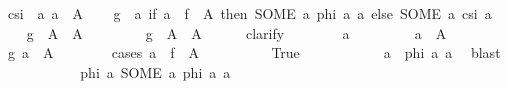 \begin{isabellebody}
\ {\isacharquery}{\kern0pt}csi\ {\isacharequal}{\kern0pt}\ {\isachardoublequoteopen}{\isasymlambda}a{\isachardot}{\kern0pt}\ a\ {\isasymin}\ A{\isachardoublequoteclose}\isanewline
\ \ \isamarkupfalse%
\ {\isacharquery}{\kern0pt}g\ {\isacharequal}{\kern0pt}\ {\isachardoublequoteopen}{\isasymlambda}a{\isacharprime}{\kern0pt}{\isachardot}{\kern0pt}\ if\ a{\isacharprime}{\kern0pt}\ {\isasymin}\ f\ {\isacharbackquote}{\kern0pt}\ A\ then\ {\isacharparenleft}{\kern0pt}SOME\ a{\isachardot}{\kern0pt}\ {\isacharquery}{\kern0pt}phi\ a{\isacharprime}{\kern0pt}\ a{\isacharparenright}{\kern0pt}\ else\ {\isacharparenleft}{\kern0pt}SOME\ a{\isachardot}{\kern0pt}\ {\isacharquery}{\kern0pt}csi\ a{\isacharparenright}{\kern0pt}{\isachardoublequoteclose}\isanewline
\ \ \isamarkupfalse%
\ {\isachardoublequoteopen}{\isacharquery}{\kern0pt}g\ {\isacharbackquote}{\kern0pt}\ A{\isacharprime}{\kern0pt}\ {\isacharequal}{\kern0pt}\ A{\isachardoublequoteclose}\isanewline
\ \ \isamarkupfalse%
\isanewline
\ \ \ \ \isamarkupfalse%
\ {\isachardoublequoteopen}{\isacharquery}{\kern0pt}g\ {\isacharbackquote}{\kern0pt}\ A{\isacharprime}{\kern0pt}\ {\isasymsubseteq}\ A{\isachardoublequoteclose}\isanewline
\ \ \ \ \isamarkupfalse%
\ clarify\isanewline
\ \ \ \ \ \ \isamarkupfalse%
\ a{\isacharprime}{\kern0pt}\isanewline
\ \ \ \ \ \ \isamarkupfalse%
\ {\isacharasterisk}{\kern0pt}{\isacharcolon}{\kern0pt}\ {\isachardoublequoteopen}a{\isacharprime}{\kern0pt}\ {\isasymin}\ A{\isacharprime}{\kern0pt}{\isachardoublequoteclose}\isanewline
\ \ \ \ \ \ \isamarkupfalse%
\ {\isachardoublequoteopen}{\isacharquery}{\kern0pt}g\ a{\isacharprime}{\kern0pt}\ {\isasymin}\ A{\isachardoublequoteclose}\isanewline
\ \ \ \ \ \ \isamarkupfalse%
\ {\isacharparenleft}{\kern0pt}cases\ {\isachardoublequoteopen}a{\isacharprime}{\kern0pt}\ {\isasymin}\ f\ {\isacharbackquote}{\kern0pt}\ A{\isachardoublequoteclose}{\isacharparenright}{\kern0pt}\isanewline
\ \ \ \ \ \ \ \ \isamarkupfalse%
\ True\isanewline
\ \ \ \ \ \ \ \ \isamarkupfalse%
\ \isamarkupfalse%
\ a\ \ {\isachardoublequoteopen}{\isacharquery}{\kern0pt}phi\ a{\isacharprime}{\kern0pt}\ a{\isachardoublequoteclose}\ \isamarkupfalse%
\ blast\isanewline
\ \ \ \ \ \ \ \ \isamarkupfalse%
\ \isamarkupfalse%
\ {\isachardoublequoteopen}{\isacharquery}{\kern0pt}phi\ a{\isacharprime}{\kern0pt}\ {\isacharparenleft}{\kern0pt}SOME\ a{\isachardot}{\kern0pt}\ {\isacharquery}{\kern0pt}phi\ a{\isacharprime}{\kern0pt}\ a{\isacharparenright}{\kern0pt}{\isachardoublequoteclose}\isanewline

\end{isabellebody}
